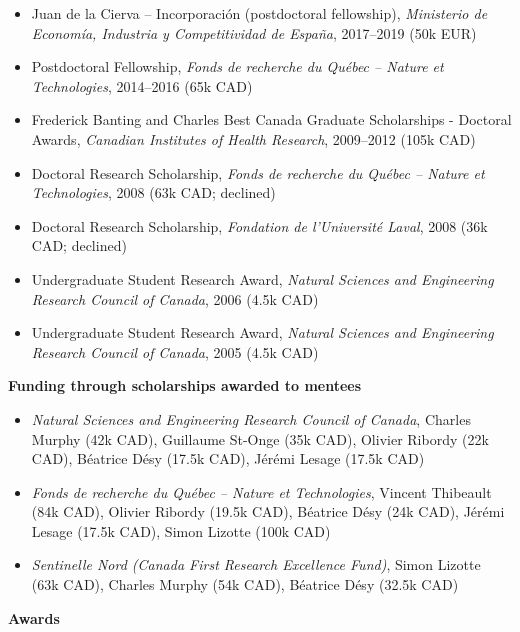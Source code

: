 \documentclass[11pt]{article}
\begin{document}
\begin{itemize}
  \item Juan de la Cierva -- Incorporaci\'on (postdoctoral fellowship), \textit{Ministerio de Econom\'ia, Industria y Competitividad de Espa\~{n}a}, 2017--2019 (50k EUR)
  \item Postdoctoral Fellowship, \textit{Fonds de recherche du Qu\'ebec -- Nature et Technologies}, 2014--2016 (65k CAD)
  \item Frederick Banting and Charles Best Canada Graduate Scholarships - Doctoral Awards, \textit{Canadian Institutes of Health Research}, 2009--2012 (105k CAD)
  \item Doctoral Research Scholarship, \textit{Fonds de recherche du Qu\'ebec -- Nature et Technologies}, 2008 (63k CAD; declined)
  \item Doctoral Research Scholarship, \textit{Fondation de l'Universit\'e Laval}, 2008 (36k CAD; declined)
  \item Undergraduate Student Research Award, \textit{Natural Sciences and Engineering Research Council of Canada}, 2006 (4.5k CAD)
  \item Undergraduate Student Research Award, \textit{Natural Sciences and Engineering Research Council of Canada}, 2005 (4.5k CAD)
\end{itemize}
%
%
%
\textbf{Funding through scholarships awarded to mentees}
%
\begin{itemize}
  \item \textit{Natural Sciences and Engineering Research Council of Canada}, Charles Murphy (42k CAD), Guillaume St-Onge (35k CAD), Olivier Ribordy (22k CAD), Béatrice Désy (17.5k CAD), Jérémi Lesage (17.5k CAD)
  \item \textit{Fonds de recherche du Qu\'ebec -- Nature et Technologies}, Vincent Thibeault (84k CAD), Olivier Ribordy (19.5k CAD), Béatrice Désy (24k CAD), Jérémi Lesage (17.5k CAD), Simon Lizotte (100k CAD)
  \item \textit{Sentinelle Nord (Canada First Research Excellence Fund)}, Simon Lizotte (63k CAD), Charles Murphy (54k CAD), Béatrice Désy (32.5k CAD)
\end{itemize}
%
%
%
\textbf{Awards}
%
\end{document}
